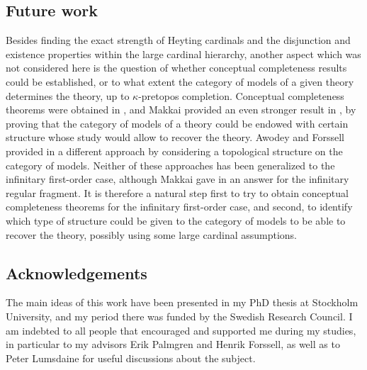 \documentclass[a4paper,11pt]{article}
\theoremstyle{plain}
\theoremstyle{plain}
\theoremstyle{remark}
\begin{document}
\subsection{Future work}

Besides finding the exact strength of Heyting cardinals and the disjunction and existence properties within the large cardinal hierarchy, another aspect which was not considered here is the question of whether conceptual completeness results could be established, or to what extent the category of models of a given theory determines the theory, up to $\kappa$-pretopos completion. Conceptual completeness theorems were obtained in \cite{mr}, and Makkai provided an even stronger result in \cite{makkai2}, by proving that the category of models of a theory could be endowed with certain structure whose study would allow to recover the theory. Awodey and Forssell provided in \cite{af} a different approach by considering a topological structure on the category of models. Neither of these approaches has been generalized to the infinitary first-order case, although Makkai gave in \cite{makkai} an answer for the infinitary regular fragment. It is therefore a natural step first to try to obtain conceptual completeness theorems for the infinitary first-order case, and second, to identify which type of structure could be given to the category of models to be able to recover the theory, possibly using some large cardinal assumptions.

\subsection{Acknowledgements} The main ideas of this work have been presented in my PhD thesis at Stockholm University, and my period there was funded by the Swedish Research Council. I am indebted to all people that encouraged and supported me during my studies, in particular to my advisors Erik Palmgren and Henrik Forssell, as well as to Peter Lumsdaine for useful discussions about the subject.





\renewcommand{\bibname}{References} %




  



\end{document}
